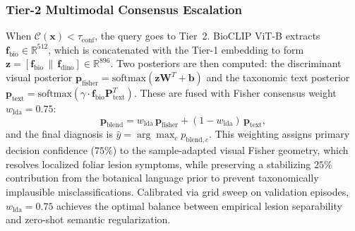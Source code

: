 \documentclass[preprint,12pt]{elsarticle}
\begin{document}
\subsubsection{Tier-2 Multimodal Consensus Escalation}
When $\mathcal{C}(\mathbf{x}) < \tau_{\text{conf}}$, the query goes to Tier~2. BioCLIP ViT-B extracts $\mathbf{f}_{\text{bio}} \in \mathbb{R}^{512}$, which is concatenated with the Tier-1 embedding to form $\mathbf{z} = [\mathbf{f}_{\text{bio}} \,\|\, \mathbf{f}_{\text{dino}}] \in \mathbb{R}^{896}$. Two posteriors are then computed: the discriminant visual posterior $\mathbf{p}_{\text{fisher}} = \text{softmax}(\mathbf{z}\mathbf{W}^T + \mathbf{b})$ and the taxonomic text posterior $\mathbf{p}_{\text{text}} = \text{softmax}(\gamma \cdot \mathbf{f}_{\text{bio}}\mathbf{P}_{\text{text}}^T)$. These are fused with Fisher consensus weight $w_{\text{lda}} = 0.75$:
\begin{equation}
    \label{eq:multimodal_blend}
    \mathbf{p}_{\text{blend}} = w_{\text{lda}} \, \mathbf{p}_{\text{fisher}} + (1 - w_{\text{lda}}) \, \mathbf{p}_{\text{text}},
\end{equation}
and the final diagnosis is $\hat{y} = \arg\max_c p_{\text{blend}, c}$. This weighting assigns primary decision confidence ($75\%$) to the sample-adapted visual Fisher geometry, which resolves localized foliar lesion symptoms, while preserving a stabilizing $25\%$ contribution from the botanical language prior to prevent taxonomically implausible misclassifications. Calibrated via grid sweep on validation episodes, $w_{\text{lda}} = 0.75$ achieves the optimal balance between empirical lesion separability and zero-shot semantic regularization.
\end{document}
